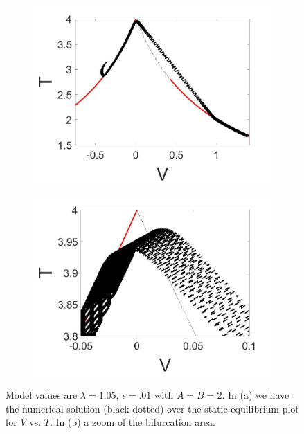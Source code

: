 \begin{figure}[H]
\centering
\begin{subfigure}{.5\textwidth}
  \centering
  \includegraphics[width=\linewidth]{twoD/slowosc_Tplot_medium.jpg}
  \caption{}
\end{subfigure}%
\begin{subfigure}{.5\textwidth}
  \centering
  \includegraphics[width=\linewidth]{twoD/slowosc_Tplot_medium_zoom.jpg}
  \caption{}
\end{subfigure}
\caption{Model values are $\lambda=1.05$, $\epsilon=.01$ with $A=B=2$. In (a) we have the numerical solution (black dotted) over the static equilibrium plot for $V$ vs. $T$. In (b) a zoom of the bifurcation area.}
\label{fig:twoD_slowosc_Tnumerics_medium}
\end{figure}

